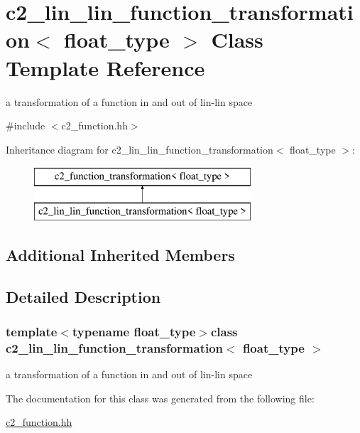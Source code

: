 \hypertarget{classc2__lin__lin__function__transformation}{\section{c2\-\_\-lin\-\_\-lin\-\_\-function\-\_\-transformation$<$ float\-\_\-type $>$ Class Template Reference}
\label{classc2__lin__lin__function__transformation}
}


a transformation of a function in and out of lin-\/lin space  




{\ttfamily \#include $<$c2\-\_\-function.\-hh$>$}

Inheritance diagram for c2\-\_\-lin\-\_\-lin\-\_\-function\-\_\-transformation$<$ float\-\_\-type $>$\-:\begin{figure}[H]
\begin{center}
\leavevmode
\includegraphics[height=2.000000cm]{classc2__lin__lin__function__transformation}
\end{center}
\end{figure}
\subsection*{Additional Inherited Members}


\subsection{Detailed Description}
\subsubsection*{template$<$typename float\-\_\-type$>$class c2\-\_\-lin\-\_\-lin\-\_\-function\-\_\-transformation$<$ float\-\_\-type $>$}

a transformation of a function in and out of lin-\/lin space 



The documentation for this class was generated from the following file\-:\begin{DoxyCompactItemize}
\item 
\hyperlink{c2__function_8hh}{c2\-\_\-function.\-hh}\end{DoxyCompactItemize}
